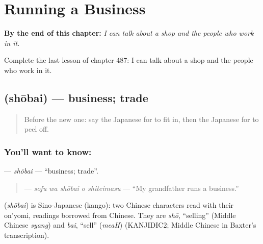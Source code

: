
\chapter{Running a Business}
\label{ch:ja-running-a-business}

\begin{chapteropening}
\textbf{By the end of this chapter:} \emph{I can talk about a shop and the people who work in it.}

Complete the last lesson of chapter 487: I can talk about a shop and the people who work in it.
\end{chapteropening}

\section[\texorpdfstring{\ja{しょうばい} (shōbai)}{しょうばい (shōbai)}]{ (shōbai) — business; trade}

\label{lesson:JA-C487-shoubai}



\begin{quote}
Before the new one: say the Japanese for to fit in, then the Japanese for to peel off.
\end{quote}

\subsection*{You'll want to know: }
\textbf{} — \emph{shōbai} — \textquotedblleft{}business; trade\textquotedblright{}.

\begin{quote}
\textbf{  } — \emph{sofu wa shōbai o shiteimasu} — \textquotedblleft{}My grandfather runs a business.\textquotedblright{}
\end{quote}

\begin{cousinweb}
\textbf{} (\emph{shōbai}) is Sino-Japanese (kango): two Chinese characters read with their on'yomi, readings borrowed from Chinese. They are \emph{shō}, \textquotedblleft{}selling\textquotedblright{} (Middle Chinese \emph{syang}) and \emph{bai}, \textquotedblleft{}sell\textquotedblright{} (\emph{meaH}) (KANJIDIC2; Middle Chinese in Baxter's transcription).
\end{cousinweb}

